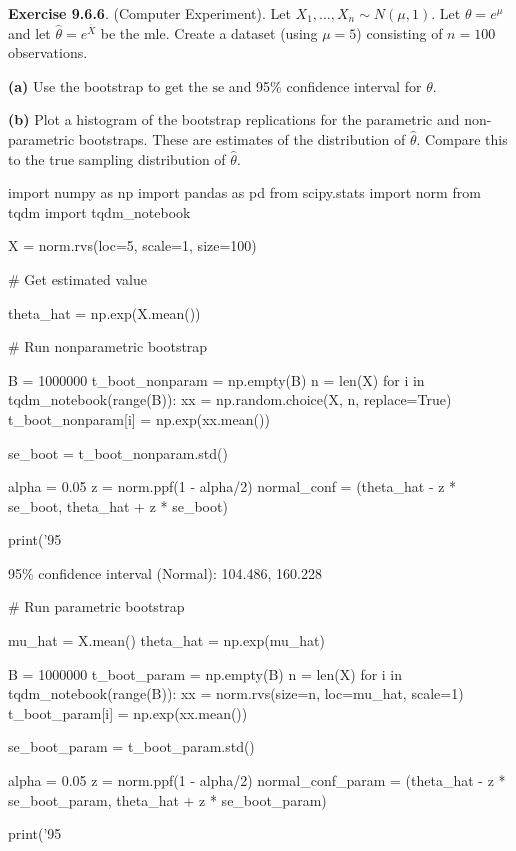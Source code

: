 \textbf{Exercise 9.6.6}. (Computer Experiment). Let
\(X_{1}, \dots, X_{n} \sim N(\mu, 1)\). Let \(\theta = e^\mu\)and let
\(\hat{\theta} = e^{\overline{X}}\) be the mle. Create a dataset (using
\(\mu = 5\)) consisting of \(n = 100\) observations.

\textbf{(a)} Use the bootstrap to get the \(\text{se}\) and 95\%
confidence interval for \(\theta\).

\textbf{(b)} Plot a histogram of the bootstrap replications for the
parametric and non-parametric bootstraps. These are estimates of the
distribution of \(\hat{\theta}\). Compare this to the true sampling
distribution of \(\hat{\theta}\).

\begin{python}
import numpy as np
import pandas as pd
from scipy.stats import norm
from tqdm import tqdm_{n}otebook

X = norm.rvs(loc=5, scale=1, size=100)
\end{python}

\begin{python}
# Get estimated value

theta_hat = np.exp(X.mean())

# Run nonparametric bootstrap

B = 1000000
t_boot_{n}onparam = np.empty(B)
n = len(X)
for i in tqdm_{n}otebook(range(B)):
    xx = np.random.choice(X, n, replace=True)
    t_boot_{n}onparam[i] = np.exp(xx.mean())
    
se_boot = t_boot_{n}onparam.std()

alpha = 0.05
z = norm.ppf(1 - alpha/2)
normal_conf = (theta_hat - z * se_boot, theta_hat + z * se_boot)

print('95%
\end{python}

\begin{console}
95\% confidence interval (Normal):        104.486, 160.228
\end{console}

\begin{python}
# Run parametric bootstrap

mu_hat = X.mean()
theta_hat = np.exp(mu_hat)

B = 1000000
t_boot_param = np.empty(B)
n = len(X)
for i in tqdm_{n}otebook(range(B)):
    xx = norm.rvs(size=n, loc=mu_hat, scale=1)
    t_boot_param[i] = np.exp(xx.mean())
    
se_boot_param = t_boot_param.std()

alpha = 0.05
z = norm.ppf(1 - alpha/2)
normal_conf_param = (theta_hat - z * se_boot_param, theta_hat + z * se_boot_param)

print('95%
\end{python}



